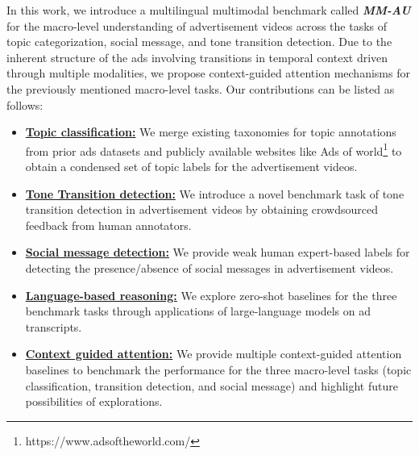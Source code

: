 In this work, we introduce a multilingual multimodal benchmark called \textbf{\textit{MM-AU}} for the macro-level understanding of advertisement videos across the tasks of topic categorization, social message, and tone transition detection. Due to the inherent structure of the ads involving transitions in temporal context driven through multiple modalities, we propose context-guided attention mechanisms for the previously mentioned macro-level tasks. Our contributions can be listed as follows:
\begin{itemize}
    \item \textbf{\underline{Topic classification:}} We merge existing taxonomies for topic annotations from prior ads datasets and publicly available websites like {Ads of world}\footnote{https://www.adsoftheworld.com/} to obtain a condensed set of topic labels for the advertisement videos.
    \item \textbf{\underline{Tone Transition detection:}} We introduce a novel benchmark task of tone transition detection in advertisement videos by obtaining crowdsourced feedback from human annotators.
    \item \textbf{\underline{Social message detection:}} We provide weak human expert-based labels for detecting the presence/absence of social messages in advertisement videos.
    \item \textbf{\underline{Language-based reasoning:}} We explore zero-shot baselines for the three benchmark tasks through applications of large-language models on ad transcripts.
    \item \textbf{\underline{Context guided attention:}} We provide multiple context-guided attention baselines to benchmark the performance for the three macro-level tasks (topic classification, transition detection, and social message) and highlight future possibilities of explorations.
\end{itemize}

